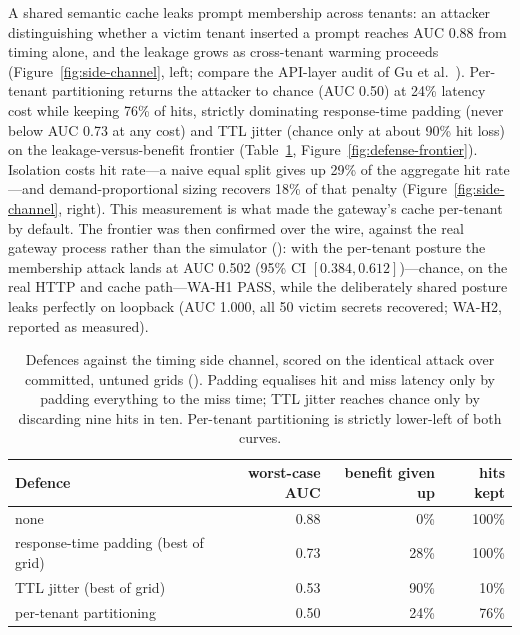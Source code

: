 A shared semantic cache leaks prompt membership across tenants: an
attacker distinguishing whether a victim tenant inserted a prompt reaches
AUC 0.88 from timing alone, and the leakage grows as cross-tenant warming
proceeds (Figure~\ref{fig:side-channel}, left; compare the API-layer audit
of Gu et al.~\citep{promptcacheaudit2025}). Per-tenant partitioning
returns the attacker to chance (AUC 0.50) at 24\% latency cost while
keeping 76\% of hits, strictly dominating response-time padding (never
below AUC 0.73 at any cost) and TTL jitter (chance only at about 90\% hit
loss) on the leakage-versus-benefit frontier
(Table~\ref{tab:defences}, Figure~\ref{fig:defense-frontier}). Isolation
costs hit rate---a naive equal split gives up 29\% of the aggregate hit
rate---and demand-proportional sizing recovers 18\% of that penalty
(Figure~\ref{fig:side-channel}, right). This measurement is what made the
gateway's cache per-tenant by default. The frontier was then confirmed
over the wire, against the real gateway process rather than the simulator
(): with the per-tenant posture the
membership attack lands at AUC 0.502 (95\% CI $[0.384, 0.612]$)---chance,
on the real HTTP and cache path---WA-H1 PASS, while the deliberately
shared posture leaks perfectly on loopback (AUC 1.000, all 50 victim
secrets recovered; WA-H2, reported as measured).

\begin{table}[htbp]
\centering\tablefontsmall\setlength{\tabcolsep}{5pt}
\begin{tabular}{@{}lrrr@{}}
\toprule
\textbf{Defence} & \textbf{worst-case AUC} & \textbf{benefit given up} & \textbf{hits kept} \\
\midrule
none                         & 0.88 & 0\%  & 100\% \\
response-time padding (best of grid) & 0.73 & 28\% & 100\% \\
TTL jitter (best of grid)    & 0.53 & 90\% & 10\% \\
per-tenant partitioning      & 0.50 & 24\% & 76\% \\
\bottomrule
\end{tabular}
\caption{Defences against the timing side channel, scored on the identical
attack over committed, untuned grids (). Padding
equalises hit and miss latency only by padding everything to the miss
time; TTL jitter reaches chance only by discarding nine hits in ten.
Per-tenant partitioning is strictly lower-left of both curves.}
\label{tab:defences}
\end{table}

